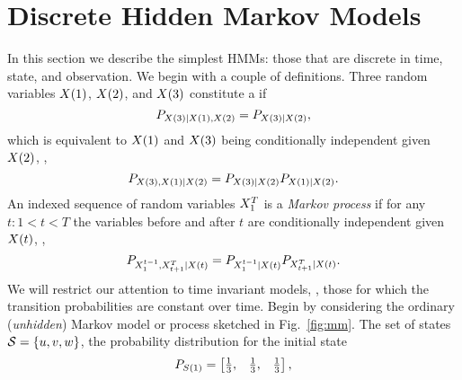 


\section{Discrete Hidden Markov Models}
\label{sec:intro_hmm}
%

In this section we describe the simplest HMMs: those that are
discrete in time, state, and observation.    We begin with a couple of
definitions.  Three random variables ${X}{(1)}$, ${X}{(2)}$, and
${X}{(3)}$ constitute a \emph{} if
\begin{equation}
  \label{eq:MarkovChain}
  P_{{X}{(3)}|{X}{(1)},{X}{(2)}} = P_{{X}{(3)}|{X}{(2)}},
\end{equation}
which is equivalent to ${X}{(1)}$ and ${X}{(3)}$ being conditionally
independent given ${X}{(2)}$, \ie,
\begin{equation*}
  P_{{X}{(3)},{X}{(1)}|{X}{(2)}} = P_{{X}{(3)}|{X}{(2)}}   P_{{X}{(1)}|{X}{(2)}}.
\end{equation*}
An indexed sequence of random variables $X_{1}^{T}$ is a
\emph{Markov process}  if
for any $t: 1 < t < T$ the variables before and after $t$ are
conditionally independent given ${X}{(t)}$, \ie,
\begin{equation}
  \label{eq:MarkovProcess}
  P_{X_{1}^{t-1},X_{t+1}^{T}|{X}{(t)}} =
  P_{X_{1}^{t-1}|{X}{(t)}} P_{X_{t+1}^{T}|{X}{(t)}}.
\end{equation}
We will restrict our attention to time invariant models, \ie, those
for which the transition probabilities are constant over time.
Begin by considering the ordinary (\emph{unhidden})
Markov model or process sketched in Fig.~\ref{fig:mm}.  The set of
states $\states = \left\{u,v,w\right\}$, the probability distribution
for the initial state
\begin{equation}
  \label{eq:InitialProbabilites}
P_{{S}{(1)}} =
\begin{bmatrix}
  \frac{1}{3}, & \frac{1}{3}, & \frac{1}{3}
\end{bmatrix},  
\end{equation}
